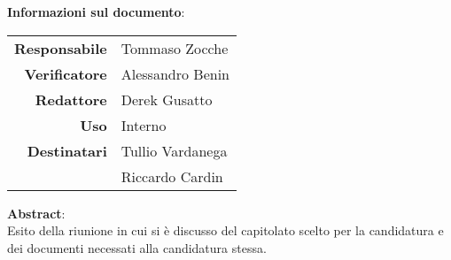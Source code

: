 \begin{center}
\textbf{Informazioni sul documento}: \\
\vspace{0.5cm}

\begin{tabular}{r|l}
    \textbf{Responsabile} & Tommaso Zocche \\ 
    \textbf{Verificatore} & Alessandro Benin \\ 
    \textbf{Redattore} & Derek Gusatto \\ 
    \textbf{Uso} & Interno \\ 
    \textbf{Destinatari} & Tullio Vardanega \\ & Riccardo Cardin \\ 
\end{tabular}

\vfill

\textbf{Abstract}: \\
\vspace{0.5cm}
Esito della riunione in cui si è discusso del capitolato scelto per la candidatura e dei documenti necessati alla candidatura stessa.
\end{center}


\bigskip